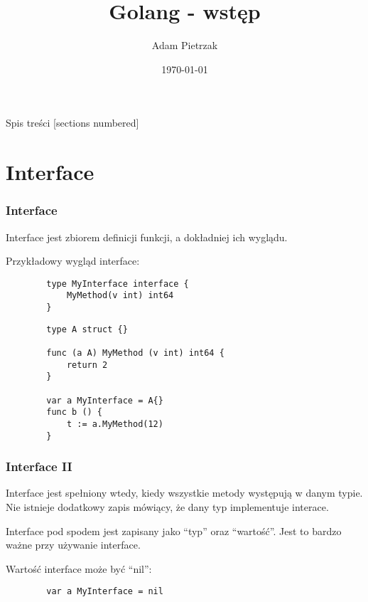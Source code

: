 \documentclass[10pt]{beamer}
\title{Golang - wstęp}
\date{\today}
\author{Adam Pietrzak}
\institute{}
\newcommand{\quotes}[1]{``#1''}
\begin{document}
\maketitle

\begin{frame}{Spis treści}
  [sections numbered]
  \tableofcontents%
\end{frame}

\section[Interface]{Interface}
\begin{frame}[fragile]
    \frametitle{Interface}
    Interface jest zbiorem definicji funkcji, a dokładniej ich wyglądu.

    Przykładowy wygląd interface:

    \begin{verbatim}
        type MyInterface interface {
            MyMethod(v int) int64
        }
    \end{verbatim}

    \begin{verbatim}
        type A struct {}

        func (a A) MyMethod (v int) int64 {
            return 2
        }

        var a MyInterface = A{}
        func b () {
            t := a.MyMethod(12)
        }
    \end{verbatim}
\end{frame}

\begin{frame}[fragile]
    \frametitle{Interface II}
    Interface jest spełniony wtedy, kiedy wszystkie metody występują w danym typie.
    Nie istnieje dodatkowy zapis mówiący, że dany typ implementuje interace.

    Interface pod spodem jest zapisany jako \quotes{typ} oraz \quotes{wartość}.
    Jest to bardzo ważne przy używanie interface.

    Wartość interface może być \quotes{nil}:
    \begin{verbatim}
        var a MyInterface = nil
    \end{verbatim}
\end{frame}
\end{document}
